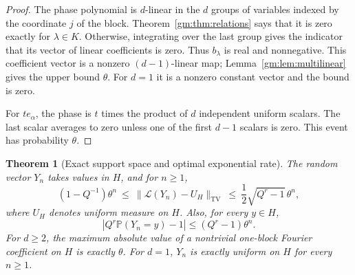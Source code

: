 \documentclass[11pt,a4paper]{article}
\numberwithin{equation}{section}
\newtheorem{theorem}{Theorem}[section]
\theoremstyle{definition}
\theoremstyle{remark}
\newcommand{\PP}{\mathbb P}
\newcommand{\1}{\mathbf 1}
\newcommand{\TV}{\operatorname{TV}}
\newcommand{\Law}{\mathcal L}
\newcommand{\norm}[1]{\lVert #1\rVert}
\begin{document}
\begin{proof}
The phase polynomial is $d$-linear in the $d$ groups of variables indexed
by the coordinate $j$ of the block. Theorem~\ref{gm:thm:relations} says
that it is zero exactly for $\lambda\in K$. Otherwise, integrating over
the last group gives the indicator that its vector of linear coefficients
is zero. Thus $b_\lambda$ is real and nonnegative. This coefficient vector
is a nonzero $(d-1)$-linear map; Lemma~\ref{gm:lem:multilinear} gives the
upper bound $\theta$. For $d=1$ it is a nonzero constant vector and the
bound is zero.

For $t e_\alpha$, the phase is $t$ times the product of $d$ independent
uniform scalars. The last scalar averages to zero unless one of the first
$d-1$ scalars is zero. This event has probability $\theta$.
\end{proof}

\begin{theorem}[Exact support space and optimal exponential rate]
\label{gm:thm:mixing}
The random vector $Y_n$ takes values in $H$, and for $n\geq1$,
\begin{equation}\label{gm:eq:tv}
 (1-Q^{-1})\theta^n
 \ \leq\ \norm{\Law(Y_n)-U_H}_{\TV}
 \ \leq\ \frac12\sqrt{Q^r-1}\,\theta^n,
\end{equation}
where $U_H$ denotes uniform measure on $H$. Also, for every $y\in H$,
\begin{equation}\label{gm:eq:pointwise}
 \left|Q^r\PP(Y_n=y)-1\right|\leq(Q^r-1)\theta^n.
\end{equation}
For $d\geq2$, the maximum absolute value of a nontrivial one-block Fourier
coefficient on $H$ is exactly $\theta$. For $d=1$, $Y_n$ is exactly uniform
on $H$ for every $n\geq1$.
\end{theorem}
\end{document}
